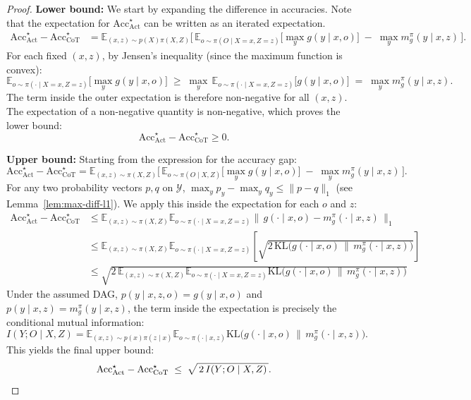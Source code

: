 \documentclass{article}
\theoremstyle{plain}
\def\E{\mathbb{E}}
\begin{document}
\begin{proof}
\textbf{Lower bound:}
We start by expanding the difference in accuracies. Note that the expectation for $\mathrm{Acc}^{\star}_{\mathrm{Act}}$ can be written as an iterated expectation.
\begin{align*}
\mathrm{Acc}^{\star}_{\mathrm{Act}}-\mathrm{Acc}^{\star}_{\mathrm{CoT}} 
&= \E_{(x,z)\sim p(X)\pi(X,Z)}\Big[\,
      \E_{o\sim \pi(O\mid X=x,Z=z)} \big[\max_{y} g(y\mid x,o)\big]
      \;-\; \max_{y} m_g^{\pi}(y\mid x,z)\,\Big].
\end{align*}
For each fixed $(x,z)$, by Jensen's inequality (since the maximum function is convex):
\[
\E_{o\sim \pi(\cdot\mid X=x,Z=z)} \big[\max_{y} g(y\mid x,o)\big]
\;\ge\; \max_{y}\,\E_{o\sim \pi(\cdot\mid X=x,Z=z)} \big[g(y\mid x,o)\big]
\;=\; \max_{y} m_g^{\pi}(y\mid x,z).
\]
The term inside the outer expectation is therefore non-negative for all $(x,z)$.
The expectation of a non-negative quantity is non-negative, which proves the lower bound:
\[
\mathrm{Acc}^{\star}_{\mathrm{Act}}-\mathrm{Acc}^{\star}_{\mathrm{CoT}}\ge 0.
\]

\textbf{Upper bound:} 
Starting from the expression for the accuracy gap:
\[
\mathrm{Acc}^{\star}_{\mathrm{Act}}-\mathrm{Acc}^{\star}_{\mathrm{CoT}}
= \E_{(x,z)\sim \pi(X,Z)}\Big[\,
      \E_{o\sim \pi(O\mid X,Z)} \big[\max_{y} g(y\mid x,o)\big]
      \;-\; \max_{y} m_g^{\pi}(y\mid x,z)\,\Big].
\]
For any two probability vectors $p,q$ on $\mathcal Y$, $\max_y p_y - \max_y q_y \le \|p-q\|_1$ (see Lemma~\ref{lem:max-diff-l1}).
We apply this inside the expectation for each $o$ and $z$:
\begin{align*}
\mathrm{Acc}^{\star}_{\mathrm{Act}}-\mathrm{Acc}^{\star}_{\mathrm{CoT}}
&\le \E_{(x,z)\sim \pi(X,Z)} \E_{o\sim \pi(\cdot\mid X=x,Z=z)}
      \big\|\,g(\cdot\mid x,o)-m_g^{\pi}(\cdot\mid x,z)\,\big\|_1 \\
&\le \E_{(x,z)\sim \pi(X,Z)} \E_{o\sim \pi(\cdot\mid X=x,Z=z)}
      \left[ \sqrt{2\,\mathrm{KL}\!\big(g(\cdot\mid x,o)\,\|\,m_g^{\pi}(\cdot\mid x,z)\big)} \right] \\
&\le \sqrt{2\, \E_{(x,z)\sim \pi(X,Z)} \E_{o\sim \pi(\cdot\mid X=x,Z=z)} \mathrm{KL}\!\big(g(\cdot\mid x,o)\,\|\,m_g^{\pi}(\cdot\mid x,z)\big)}
\end{align*}
Under the assumed DAG, $p(y\mid x,z,o)=g(y\mid x,o)$ and $p(y\mid x,z)=m_g^{\pi}(y\mid x,z)$, the term inside the expectation is precisely the conditional mutual information:
\[
I(Y;O\mid X,Z) = \E_{(x,z)\sim p(x)\pi(z\mid x)} \E_{o\sim \pi(\cdot\mid x,z)}
  \mathrm{KL}\!\big(g(\cdot\mid x,o)\,\|\,m_g^{\pi}(\cdot\mid x,z)\big).
\]
This yields the final upper bound:
\[
\mathrm{Acc}^{\star}_{\mathrm{Act}}-\mathrm{Acc}^{\star}_{\mathrm{CoT}}
\;\le\; \sqrt{\,2\,I(Y;O\mid X,Z)\,}. \qedhere
\]
\end{proof}
\end{document}
